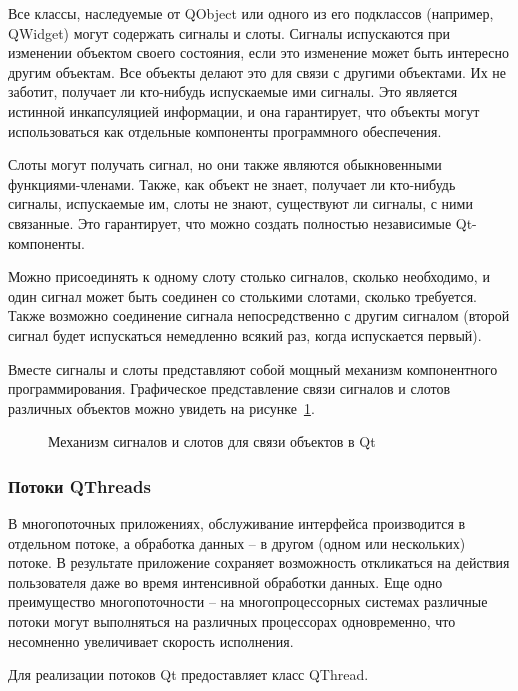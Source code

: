 Все классы, наследуемые от QObject или одного из его подклассов (например, QWidget) могут содержать сигналы и слоты. Сигналы испускаются при изменении объектом своего состояния, если это изменение может быть интересно другим объектам. Все объекты делают это для связи с другими объектами. Их не заботит, получает ли кто-нибудь испускаемые ими сигналы. Это является истинной инкапсуляцией информации, и она гарантирует, что объекты могут использоваться как отдельные компоненты программного обеспечения.

Слоты могут получать сигнал, но они также являются обыкновенными функциями-членами. Также, как объект не знает, получает ли кто-нибудь сигналы, испускаемые им, слоты не знают, существуют ли сигналы, с ними связанные. Это гарантирует, что можно создать полностью независимые Qt-компоненты.

Можно присоединять к одному слоту столько сигналов, сколько необходимо, и один сигнал может быть соединен со столькими слотами, сколько требуется. Также возможно соединение сигнала непосредственно с другим сигналом (второй сигнал будет испускаться немедленно всякий раз, когда испускается первый).

Вместе сигналы и слоты представляют собой мощный механизм компонентного программирования. Графическое представление связи сигналов и слотов различных объектов можно увидеть на рисунке~\ref{signals-slots:signals-slots}. \cite{signalsandslots}

\begin{figure}[h!]
\caption{ Механизм сигналов и слотов для связи объектов в Qt }
\label{signals-slots:signals-slots}
\end{figure}

\subsubsection{ Потоки QThreads }

В многопоточных приложениях, обслуживание интерфейса производится в отдельном потоке, а обработка данных -- в другом (одном или нескольких) потоке. В результате приложение сохраняет возможность откликаться на действия пользователя даже во время интенсивной обработки данных. Еще одно преимущество многопоточности -- на многопроцессорных системах различные потоки могут выполняться на различных процессорах одновременно, что несомненно увеличивает скорость исполнения.

Для реализации потоков Qt предоставляет класс QThread.


